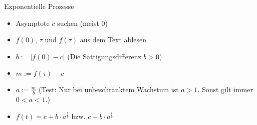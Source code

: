 \begin{rezept}{Exponentielle Prozesse}{}
  \begin{itemize}
  \item Asymptote $c$ suchen (meist 0)
  \item $f(0)$, $\tau$ und $f(\tau)$ aus dem Text ablesen
  \item $b := |f(0) - c|$ (Die Sättigungsdifferenz $b>0$)
  \item $m := f(\tau) - c$
  \item $a := \frac{m}{b}$ (Test: Nur bei unbeschränktem Wachstum ist
    $a>1$. Sonst gilt immer $0 < a < 1$.)
  \item $f(t) = c+b\cdot{}a^{\frac{t}{\tau}} \text{ bzw. }  c-b\cdot{}a^{\frac{t}{\tau}} $
    \end{itemize} 
\end{rezept}


\newpage
